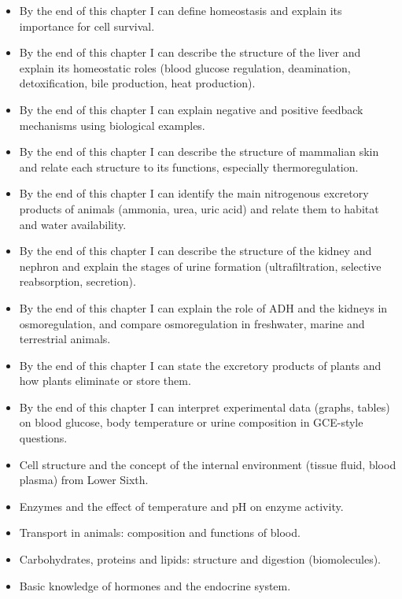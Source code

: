 \documentclass[11pt]{article}
\begin{document}
\begin{objectifs}
\begin{itemize}
\item By the end of this chapter I can define homeostasis and explain its importance for cell survival.
\item By the end of this chapter I can describe the structure of the liver and explain its homeostatic roles (blood glucose regulation, deamination, detoxification, bile production, heat production).
\item By the end of this chapter I can explain negative and positive feedback mechanisms using biological examples.
\item By the end of this chapter I can describe the structure of mammalian skin and relate each structure to its functions, especially thermoregulation.
\item By the end of this chapter I can identify the main nitrogenous excretory products of animals (ammonia, urea, uric acid) and relate them to habitat and water availability.
\item By the end of this chapter I can describe the structure of the kidney and nephron and explain the stages of urine formation (ultrafiltration, selective reabsorption, secretion).
\item By the end of this chapter I can explain the role of ADH and the kidneys in osmoregulation, and compare osmoregulation in freshwater, marine and terrestrial animals.
\item By the end of this chapter I can state the excretory products of plants and how plants eliminate or store them.
\item By the end of this chapter I can interpret experimental data (graphs, tables) on blood glucose, body temperature or urine composition in GCE-style questions.
\end{itemize}
\end{objectifs}

\begin{prerequis}
\begin{itemize}
\item Cell structure and the concept of the internal environment (tissue fluid, blood plasma) from Lower Sixth.
\item Enzymes and the effect of temperature and pH on enzyme activity.
\item Transport in animals: composition and functions of blood.
\item Carbohydrates, proteins and lipids: structure and digestion (biomolecules).
\item Basic knowledge of hormones and the endocrine system.
\end{itemize}
\end{prerequis}
\end{document}
